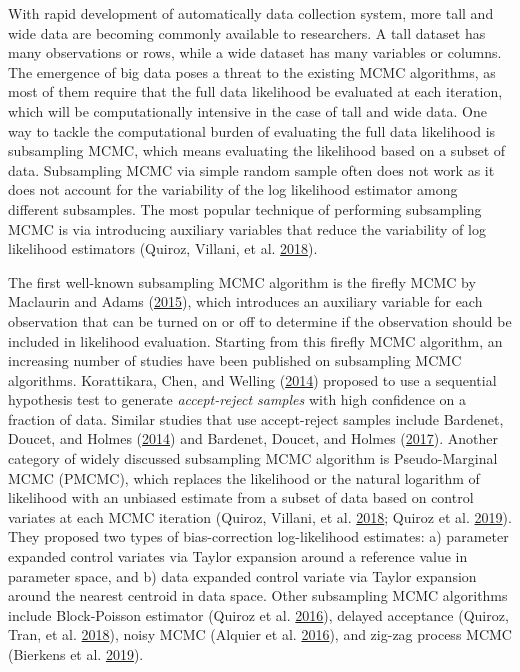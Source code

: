 \documentclass[12pt]{book}
\numberwithin{equation}{chapter}
\begin{document}
With rapid development of automatically data collection system, more tall and wide data are becoming commonly available to researchers. A tall dataset has many observations or rows, while a wide dataset has many variables or columns. The emergence of big data poses a threat to the existing MCMC algorithms, as most of them require that the full data likelihood be evaluated at each iteration, which will be computationally intensive in the case of tall and wide data. One way to tackle the computational burden of evaluating the full data likelihood is subsampling MCMC, which means evaluating the likelihood based on a subset of data. Subsampling MCMC via simple random sample often does not work as it does not account for the variability of the log likelihood estimator among different subsamples. The most popular technique of performing subsampling MCMC is via introducing auxiliary variables that reduce the variability of log likelihood estimators (Quiroz, Villani, et al. \protect\hyperlink{ref-quiroz2018subsampling}{2018}).

The first well-known subsampling MCMC algorithm is the firefly MCMC by Maclaurin and Adams (\protect\hyperlink{ref-maclaurin2015firefly}{2015}), which introduces an auxiliary variable for each observation that can be turned on or off to determine if the observation should be included in likelihood evaluation. Starting from this firefly MCMC algorithm, an increasing number of studies have been published on subsampling MCMC algorithms. Korattikara, Chen, and Welling (\protect\hyperlink{ref-korattikara2014austerity}{2014}) proposed to use a sequential hypothesis test to generate \emph{accept-reject samples} with high confidence on a fraction of data. Similar studies that use accept-reject samples include Bardenet, Doucet, and Holmes (\protect\hyperlink{ref-bardenet2014towards}{2014}) and Bardenet, Doucet, and Holmes (\protect\hyperlink{ref-bardenet2017markov}{2017}). Another category of widely discussed subsampling MCMC algorithm is Pseudo-Marginal MCMC (PMCMC), which replaces the likelihood or the natural logarithm of likelihood with an unbiased estimate from a subset of data based on control variates at each MCMC iteration (Quiroz, Villani, et al. \protect\hyperlink{ref-quiroz2018subsampling}{2018}; Quiroz et al. \protect\hyperlink{ref-quiroz2019speeding}{2019}). They proposed two types of bias-correction log-likelihood estimates: a) parameter expanded control variates via Taylor expansion around a reference value in parameter space, and b) data expanded control variate via Taylor expansion around the nearest centroid in data space. Other subsampling MCMC algorithms include Block-Poisson estimator (Quiroz et al. \protect\hyperlink{ref-quiroz2016block}{2016}), delayed acceptance (Quiroz, Tran, et al. \protect\hyperlink{ref-quiroz2018speeding}{2018}), noisy MCMC (Alquier et al. \protect\hyperlink{ref-alquier2016noisy}{2016}), and zig-zag process MCMC (Bierkens et al. \protect\hyperlink{ref-bierkens2019zig}{2019}).
\end{document}

